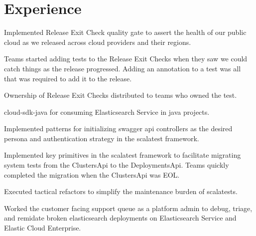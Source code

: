 \documentclass[letterpaper]{resume} %
\begin{document}
\hfill
%
%
\begin{minipage}[t]{0.66\textwidth} %


\section{Experience}

\vspace{\topsep} %
\begin{tightitemize}
\item Implemented Release Exit Check quality gate to assert the health of our public cloud as we released across cloud providers and their regions.
\item Teams started adding tests to the Release Exit Checks when they saw we could catch things as the release progressed.  Adding an annotation to a test was all that was required to add it to the release.
\item Ownership of Release Exit Checks distributed to teams who owned the test.
\item cloud-sdk-java for consuming Elasticsearch Service in java projects. 
\item Implemented patterns for initializing swagger api controllers as the desired persona and authentication strategy in the scalatest framework.
\item Implemented key primitives in the scalatest framework to facilitate migrating system tests from the ClustersApi to the DeploymentsApi.  Teams quickly completed the migration when the ClustersApi was EOL.
\item Executed tactical refactors to simplify the maintenance burden of scalatests.
\item Worked the customer facing support queue as a platform admin to debug, triage, and remidate broken elasticsearch deployments on Elasticsearch Service and Elastic Cloud Enterprise.
\end{tightitemize}

\sectionspace %


\end{minipage}
\end{document}
